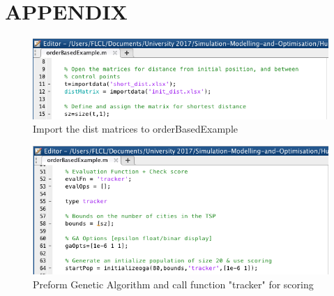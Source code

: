 \documentclass[a4paper, 10pt]{IEEEconf}
\begin{document}
%
\section*{APPENDIX}

\begin{figure}[H]
  \includegraphics[width=\linewidth, center]{images/import}
  \caption{Import the dist matrices to orderBasedExample}
  \label{fig:Import the dist matrices to orderBasedExample}
\end{figure}

\begin{figure}[H]
  \includegraphics[width=\linewidth, center]{images/scoring}
  \caption{Preform Genetic Algorithm and call function "tracker" for scoring}
  \label{fig:Preform Genetic Algorithm and call function "tracker" for scoring}
\end{figure}
\end{document}
